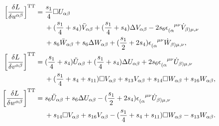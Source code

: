 \begin{align}\footnotesize
 \bigg\lbrack\frac{\delta L}{\delta u^{\alpha\beta}}\bigg\rbrack^\text{TT} = {} & \frac{s_1}{4} \Box U_{\alpha\beta} \nonumber \\ &  + (\frac{s_1}{4} + s_4) \ddot V_{\alpha\beta} + (\frac{s_1}{4} + s_4) \Delta V_{\alpha\beta} - 2s_6 \epsilon_{(\alpha}^{\hphantom{(\alpha}\mu\nu} \dot V_{\beta)\mu,\nu} \nonumber \\ & + s_6 \ddot W_{\alpha\beta} + s_6 \Delta W_{\alpha\beta} + (\frac{s_1}{2} + 2 s_4) \epsilon_{(\alpha}^{\hphantom{(\alpha}\mu\nu} \dot W_{\beta)\mu,\nu}, \nonumber \\
 \bigg\lbrack\frac{\delta L}{\delta v^{\alpha\beta}}\bigg\rbrack^\text{TT} = {} & (\frac{s_1}{4} + s_4) \ddot U_{\alpha\beta} + (\frac{s_1}{4} + s_4) \Delta U_{\alpha\beta} + 2s_6 \epsilon_{(\alpha}^{\hphantom{(\alpha}\mu\nu} \dot U_{\beta)\mu,\nu} \nonumber \\ &  + (\frac{s_1}{4} + s_4 + s_{11}) \Box V_{\alpha\beta} + s_{13} V_{\alpha\beta} + s_{14} \Box W_{\alpha\beta} + s_{16} W_{\alpha\beta}, \nonumber \\
 \bigg\lbrack\frac{\delta L}{\delta w^{\alpha\beta}}\bigg\rbrack^\text{TT} = {} & s_6 \ddot U_{\alpha\beta} + s_6 \Delta U_{\alpha\beta} - (\frac{s_1}{2} + 2 s_4) \epsilon_{(\alpha}^{\hphantom{(\alpha}\mu\nu} \dot U_{\beta)\mu,\nu}\nonumber \\ &  + s_{14} \Box V_{\alpha\beta} + s_{16} V_{\alpha\beta} - (\frac{s_1}{4} + s_4 + s_{11}) \Box W_{\alpha\beta} - s_{13} W_{\alpha\beta}. \label{tensor_equations}
\end{align}

